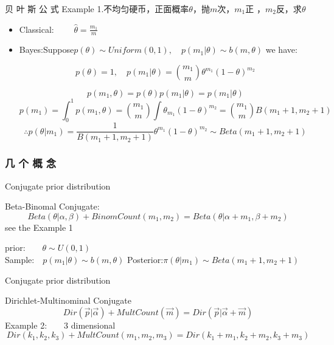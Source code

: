 \documentclass{beamer}
\begin{document}
\begin{CJK*}{UTF8}{gbsn}
\begin{frame}{贝 叶 斯 公 式}
Example 1.{不均匀硬币，正面概率}$\theta${，抛}$m${次，}$m_1${正 ，}$m_2${反，求}$\theta$
\begin{itemize}
\item Classical: $\qquad\hat{\theta}=\frac{m_1}{m}$
\item {Bayes:Suppose}\quad $p(\theta)\sim Uniform(0,1),\quad p(m_1|\theta)\sim b(m,\theta)$ {we have:}
\begin{small}

\[
p(\theta)=1,\quad p(m_1|\theta)=\binom{m_1}{m} \theta^{m_1}(1-\theta)^{m_2}\]

\[p(m_1,\theta)=p(\theta)p(m_1|\theta)=p(m_1|\theta)\]
\[
p(m_1)=\int_0^1p(m_1,\theta)=\binom{m_1}{m}\int \theta_{m_1}(1-\theta)^{m_2}=\binom{m_1}{m}B(m_1+1,m_2+1)
\]
\[\therefore p(\theta|m_1)=\frac{1}{B(m_1+1,m_2+1)}\theta^{m_1}(1-\theta)^{m_2}\sim Beta(m_1+1,m_2+1)
\]

\end{small}
\end{itemize}
\end{frame}
\subsubsection{几 个 概 念 }
\begin{frame}{Conjugate prior distribution }
\begin{itemize}
\begin{small}
\item  {Beta-Binomal Conjugate:}\[Beta(\theta|\alpha,\beta)+BinomCount(m_1,m_2)=Beta(\theta|\alpha+m_1,\beta+m_2)\]{see the Example 1}

prior:$\qquad \theta\sim U(0,1)$\\  
Sample:$\quad p(m_1|\theta)\sim b(m,\theta) $ 
Posterior:$\pi(\theta|m_1)\sim Beta(m_1+1,m_2+1) $

\end{small}
\end{itemize}
\end{frame}

\begin{frame}{Conjugate prior distribution }
\begin{itemize}
\begin{small}
\item Dirichlet-Multinominal Conjugate\[Dir(\overrightarrow{p}|\overrightarrow{\alpha})+MultCount(\overrightarrow{m})=Dir(\overrightarrow{p}|\overrightarrow{\alpha}+\overrightarrow{m})\]
Example 2:$\qquad$3 dimensional	\[Dir(k_1,k_2,k_3)+MultCount(m_1,m_2,m_3)=Dir(k_1+m_1,k_2+m_2,k_3+m_3)\]


\end{small}
\end{itemize}
\end{frame}
\end{CJK*}
\end{document}
